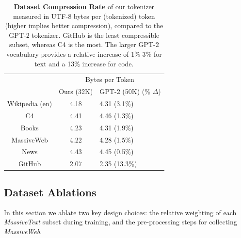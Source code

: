 \documentclass[11pt, a4paper, logo, internal, copyright, nonumbering]{deepmind}
\newcommand{\massivetext}{\textit{MassiveText}\xspace}
\newcommand{\massiveweb}{\textit{MassiveWeb}\xspace}
\begin{document}
\begin{table}[H]
    \centering
    \begin{tabular}{ccl}
    \toprule
 	    & \multicolumn{2}{c}{Bytes per Token}  \\
                & Ours (32K) & GPT-2 (50K) (\% $\Delta$) \\
    \midrule
    Wikipedia (en) & 4.18 & 4.31 (3.1\%) \\
    C4 & 4.41 & 4.46 (1.3\%) \\
    Books & 4.23 & 4.31 (1.9\%) \\
    MassiveWeb & 4.22 & 4.28 (1.5\%) \\
    News & 4.43 & 4.45 (0.5\%) \\
    GitHub & 2.07 & 2.35 (13.3\%) \\
    \bottomrule
    \end{tabular}
    \caption{\textbf{Dataset Compression Rate} of our tokenizer measured in UTF-8 bytes per (tokenized) token (higher implies better compression), compared to the GPT-2 tokenizer. GitHub is the least compressible subset, whereas C4 is the most. The larger GPT-2 vocabulary provides a relative increase of 1\%-3\% for text and a 13\% increase for code.}
    \label{tab:token_compress}
\end{table}

\subsection{Dataset Ablations}
\label{sec:dataset-ablations}
In this section we ablate two key design choices: the relative weighting of each \massivetext subset during training, and the pre-processing steps for collecting \massiveweb.
\end{document}
